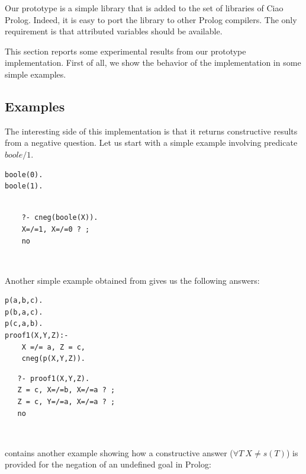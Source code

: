 \documentclass{tlp}
\begin{document}
Our prototype is a simple library that is added to the set of
libraries of Ciao Prolog. Indeed, it is easy to port the library to
other Prolog compilers. The only requirement is that attributed
variables should be available.

This section reports some experimental results from our prototype
implementation.  First of all, we show the behavior of the
implementation in some simple examples. 


\subsection{Examples}
\label{examples}

The interesting side of this implementation is that it returns
constructive results from a negative question. Let us start with a
simple example involving predicate $boole/1$.

{
\begin{minipage}{2in}
\begin{verbatim}
boole(0).
boole(1).
\end{verbatim}
\end{minipage}
\begin{minipage}{2in}
\begin{verbatim} 

    ?- cneg(boole(X)).
    X=/=1, X=/=0 ? ;
    no

\end{verbatim} 
\end{minipage}\\
}
Another simple example obtained from \cite{Stuckey95} gives us the
following answers:

{
\begin{minipage}{2in}
\begin{verbatim}
p(a,b,c).
p(b,a,c).
p(c,a,b).
proof1(X,Y,Z):-
    X =/= a, Z = c,
    cneg(p(X,Y,Z)).

\end{verbatim}
\end{minipage}
\begin{minipage}{2in}
\begin{verbatim} 
   ?- proof1(X,Y,Z).
   Z = c, X=/=b, X=/=a ? ;
   Z = c, Y=/=a, X=/=a ? ;
   no
\end{verbatim} 
\end{minipage}\\
}
\cite{Stuckey95} contains another example showing how a constructive
answer ($\forall T ~ X \neq s(T)$) is provided for the negation of an
undefined goal in Prolog:
\end{document}
